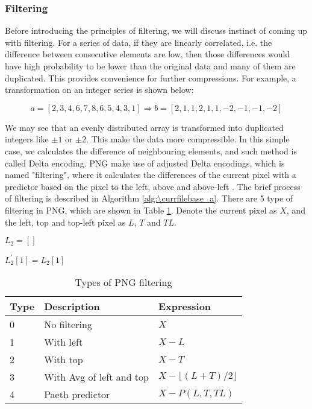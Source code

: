 \documentclass[catalog.tex]{subfiles}
\begin{document}
\subsubsection*{Filtering}

Before introducing the principles of filtering, we will discuss instinct of coming up with filtering. For a series of data, if they are linearly correlated, i.e. the difference between consecutive elements are low, then those differences would have high probability to be lower than the original data and many of them are duplicated. This provides convenience for further compressions. For example, a transformation on an integer series is shown below:

$$
a = [2,3,4,6,7,8,6,5,4,3,1] \Rightarrow b = [2,1,1,2,1,1,-2,-1,-1,-2]
$$

We may see that an evenly distributed array is transformed into duplicated integers like $\pm1$ or $\pm2$. This make the data more compressible. In this simple case, we calculates the difference of neighbouring elements, and such method is called Delta encoding. PNG make use of adjusted Delta encodings, which is named "filtering", where it calculates the differences of the current pixel with a predictor based on the pixel to the left, above and above-left \cite{colt2016how}. The brief process of filtering is described in Algorithm \ref{alg:\currfilebase_a}. There are 5 type of filtering in PNG, which are shown in Table \ref{tbl:\currfilebase_a}. Denote the current pixel as $X$, and the left, top and top-left pixel as $L$, $T$ and $TL$.

\begin{Algorithm}
    $L_2 = []$

    $L_2^\prime[1] = L_2[1]$

    
\end{Algorithm}

\begin{table}[!htb]
	\centering
	\begin{tabular}{lll}
        \toprule
        Type & Description & Expression \\
        \midrule
        0 & No filtering & $X$ \\
        1 & With left & $X-L$ \\
        2 & With top & $X-T$ \\
        3 & With Avg of left and top & $X-\lfloor(L+T)/2\rfloor$ \\
        4 & Paeth predictor & $X-P(L,T,TL)$ \\
		\bottomrule
    \end{tabular}
    \caption{Types of PNG filtering}
	\label{tbl:\currfilebase_a}
\end{table}
\end{document}
